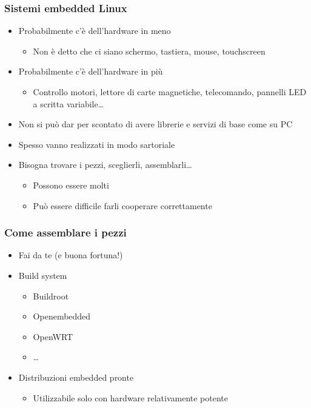 \documentclass[xetex,table]{beamer}
\begin{document}
\begin{frame}
\frametitle{Sistemi embedded Linux}
  \begin{itemize}
  \item Probabilmente c'è dell'hardware in meno
    \begin{itemize}
    \item Non è detto che ci siano schermo, tastiera, mouse,
      touchscreen
    \end{itemize}
  \item Probabilmente c'è dell'hardware in più
    \begin{itemize}
    \item Controllo motori, lettore di carte magnetiche,
      telecomando, pannelli LED a scritta variabile\ldots
    \end{itemize}
  \item Non si può dar per scontato di avere librerie e servizi di
    base come su PC
  \item Spesso vanno realizzati in modo sartoriale
  \item Bisogna trovare i pezzi, sceglierli, assemblarli\ldots
    \begin{itemize}
    \item Possono essere molti
    \item Può essere difficile farli cooperare correttamente
    \end{itemize}
  \end{itemize}
\end{frame}

\begin{frame}
\frametitle{Come assemblare i pezzi}
  \begin{itemize}
  \item Fai da te (e buona fortuna!)
  \item Build system
    \begin{itemize}
    \item Buildroot
    \item Openembedded
    \item OpenWRT
    \item \ldots
    \end{itemize}
  \item Distribuzioni embedded pronte
    \begin{itemize}
    \item Utilizzabile solo con hardware relativamente potente
    \end{itemize}
  \end{itemize}
\end{frame}
\end{document}
